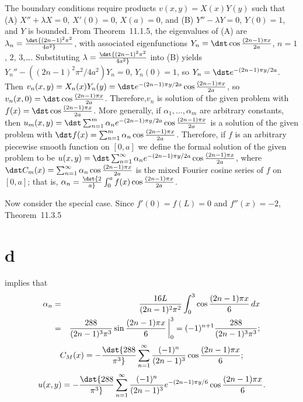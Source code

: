 \documentclass[dvips]{book}
\renewcommand{\exer}[1]{\par\medskip\;\noindent{\color{red}\bf #1.}}
\numberwithin{example}{section}
\numberwithin{equation}{section}
\numberwithin{theorem}{section}
\numberwithin{table}{section}
\numberwithin{figure}{section}
\newcommand{\lims}[2]{\,\bigg|_{#1}^{#2}}
\begin{document}
\exer{12.3.30}
The boundary conditions require products $v(x,y)=X(x)Y(y)$
such that
(A)  $X''+\lambda X=0$, $X'(0)=0$, $X(a)=0$, and
(B)  $Y''-\lambda Y=0$, $Y(0)=1$, and $Y$ is bounded.
From Theorem~11.1.5, the eigenvalues of (A) are
$\lambda_n=\dst{(2n-1)^2\pi^2\over4a^2}$, with associated
eigenfunctions
$Y_n=\dst\cos{(2n-1)\pi x\over2a}$, $n=1$, $2$, $3$,\dots.
Substituting $\lambda=\dst{(2n-1)^2\pi^2\over4a^2}$  into (B) yields
$Y_n''-((2n-1)^2\pi^2/4a^2)Y_n=0$, $Y_n(0)=1$, so
$Y_n=\dst e^{-(2n-1)\pi y/2a}$. Then
$v_n(x,y)=X_n(x)Y_n(y)=
\dst e^{-(2n-1)\pi y/2a}\cos{(2n-1)\pi x\over2a}$, so
$v_n(x,0)=\dst\cos{(2n-1)\pi x\over2a}$.
Therefore,$v_n$ is solution of the given problem  with
$f(x)=\dst\cos{(2n-1)\pi x\over2a}$. More generally,
 if $\alpha_1,\dots,\alpha_m$ are arbitrary constants,
then
$u_m(x,y)=\dst\sum_{n=1}^m\alpha_n e^{-(2n-1)\pi y/2a}\cos
{(2n-1)\pi x\over2a}$
 is a solution of the given problem with
$\dst f(x)=\sum_{n=1}^m\alpha_n\cos{(2n-1)\pi x\over2a}$.
Therefore, if $f$ is an arbitrary piecewise smooth function on
$[0,a]$  we define the formal solution of the given problem  to be
$u(x,y)=\dst\sum_{n=1}^\infty\alpha_n e^{-(2n-1)\pi y/2a}\cos
{(2n-1)\pi x\over2a}$, where
$\dst C_m(x)=\sum_{n=1}^\infty \alpha_n\cos{(2n-1)\pi x\over2a}$
is the mixed Fourier  cosine series of $f$ on $[0,a]$; that is,
$\alpha_n=\dst{2\over a}\int_0^a f(x)\cos{(2n-1)\pi x\over2a}$.




Now consider the special case.
Since $f'(0)=f(L)=0$ and $f''(x)=-2$,
Theorem~11.3.5\part{d} implies that
\begin{eqnarray*}
\alpha_n&=&
{16L\over(2n-1)^2\pi^2}
\int_0^3\cos{(2n-1)\pi x\over6}\,dx \\
&=&{288\over(2n-1)^3\pi^3}\sin{(2n-1)\pi x\over6}\lims03
=(-1)^{n+1}{288\over(2n-1)^3\pi^3};
\end{eqnarray*}
$$
C_M(x)=-\dst
{288\over\pi^3}\sum_{n=1}^\infty{(-1)^n\over
(2n-1)^3}\cos{(2n-1)\pi x\over6};
$$
$$
u(x,y)=-\dst
{288\over\pi^3}\sum_{n=1}^\infty{(-1)^n\over
(2n-1)^3}e^{-(2n-1)\pi y/6}\cos{(2n-1)\pi x\over6}.
$$
\end{document}
